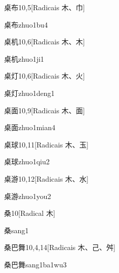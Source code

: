 \begin{entry}{桌布}{10,5}[Radicais ⽊、⼱]
  \begin{phonetics}{桌布}{zhuo1bu4}
  \end{phonetics}
\end{entry}

\begin{entry}{桌机}{10,6}[Radicais ⽊、⽊]
  \begin{phonetics}{桌机}{zhuo1ji1}
  \end{phonetics}
\end{entry}

\begin{entry}{桌灯}{10,6}[Radicais ⽊、⽕]
  \begin{phonetics}{桌灯}{zhuo1deng1}
  \end{phonetics}
\end{entry}

\begin{entry}{桌面}{10,9}[Radicais ⽊、⾯]
  \begin{phonetics}{桌面}{zhuo1mian4}
  \end{phonetics}
\end{entry}

\begin{entry}{桌球}{10,11}[Radicais ⽊、⽟]
  \begin{phonetics}{桌球}{zhuo1qiu2}
  \end{phonetics}
\end{entry}

\begin{entry}{桌游}{10,12}[Radicais ⽊、⽔]
  \begin{phonetics}{桌游}{zhuo1you2}
  \end{phonetics}
\end{entry}

\begin{entry}{桑}{10}[Radical ⽊]
  \begin{phonetics}{桑}{sang1}
  \end{phonetics}
\end{entry}

\begin{entry}{桑巴舞}{10,4,14}[Radicais ⽊、⼰、⾇]
  \begin{phonetics}{桑巴舞}{sang1ba1wu3}
  \end{phonetics}
\end{entry}

